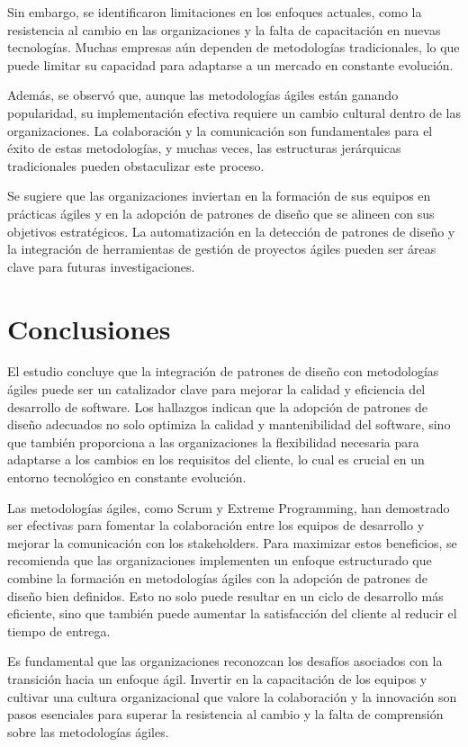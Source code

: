 \documentclass[twocolumn]{article}
\begin{document}
Sin embargo, se identificaron limitaciones en los enfoques actuales, como la resistencia al cambio en las organizaciones y la falta de capacitación en nuevas tecnologías. Muchas empresas aún dependen de metodologías tradicionales, lo que puede limitar su capacidad para adaptarse a un mercado en constante evolución.

Además, se observó que, aunque las metodologías ágiles están ganando popularidad, su implementación efectiva requiere un cambio cultural dentro de las organizaciones. La colaboración y la comunicación son fundamentales para el éxito de estas metodologías, y muchas veces, las estructuras jerárquicas tradicionales pueden obstaculizar este proceso.

Se sugiere que las organizaciones inviertan en la formación de sus equipos en prácticas ágiles y en la adopción de patrones de diseño que se alineen con sus objetivos estratégicos. La automatización en la detección de patrones de diseño y la integración de herramientas de gestión de proyectos ágiles pueden ser áreas clave para futuras investigaciones.

\section{Conclusiones}
El estudio concluye que la integración de patrones de diseño con metodologías ágiles puede ser un catalizador clave para mejorar la calidad y eficiencia del desarrollo de software. Los hallazgos indican que la adopción de patrones de diseño adecuados no solo optimiza la calidad y mantenibilidad del software, sino que también proporciona a las organizaciones la flexibilidad necesaria para adaptarse a los cambios en los requisitos del cliente, lo cual es crucial en un entorno tecnológico en constante evolución.

Las metodologías ágiles, como Scrum y Extreme Programming, han demostrado ser efectivas para fomentar la colaboración entre los equipos de desarrollo y mejorar la comunicación con los stakeholders. Para maximizar estos beneficios, se recomienda que las organizaciones implementen un enfoque estructurado que combine la formación en metodologías ágiles con la adopción de patrones de diseño bien definidos. Esto no solo puede resultar en un ciclo de desarrollo más eficiente, sino que también puede aumentar la satisfacción del cliente al reducir el tiempo de entrega.

Es fundamental que las organizaciones reconozcan los desafíos asociados con la transición hacia un enfoque ágil. Invertir en la capacitación de los equipos y cultivar una cultura organizacional que valore la colaboración y la innovación son pasos esenciales para superar la resistencia al cambio y la falta de comprensión sobre las metodologías ágiles.
\end{document}
